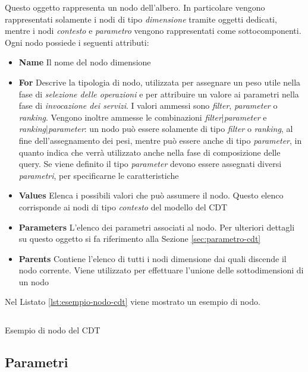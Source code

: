 Questo oggetto rappresenta un nodo dell'albero. In particolare vengono rappresentati solamente i nodi di tipo \emph{dimensione} tramite oggetti dedicati, mentre i nodi \emph{contesto} e \emph{parametro} vengono rappresentati come sottocomponenti. Ogni nodo possiede i seguenti attributi:

\begin{itemize}
	\item \textbf{Name}
	Il nome del nodo dimensione
	\item \textbf{For}
	Descrive la tipologia di nodo, utilizzata per assegnare un peso utile nella fase di \emph{selezione delle operazioni} e per attribuire un valore ai parametri nella fase di \emph{invocazione dei servizi}. I valori ammessi sono \emph{filter}, \emph{parameter} o \emph{ranking}. Vengono inoltre ammesse le combinazioni \emph{filter}|\emph{parameter} e \emph{ranking}|\emph{parameter}: un nodo può essere solamente di tipo \emph{filter} o \emph{ranking}, al fine dell'assegnamento dei pesi, mentre può essere anche di tipo \emph{parameter}, in quanto indica che verrà utilizzato anche nella fase di composizione delle query. Se viene definito il tipo \emph{parameter} devono essere assegnati diversi \emph{parametri}, per specificarne le caratteristiche
	\item \textbf{Values}
	Elenca i possibili valori che può assumere il nodo. Questo elenco corrisponde ai nodi di tipo \emph{contesto} del modello del CDT
	\item \textbf{Parameters}
	L'elenco dei parametri associati al nodo. Per ulteriori dettagli su questo oggetto si fa riferimento alla Sezione \ref{sec:parametro-cdt}
	\item \textbf{Parents}
	Contiene l'elenco di tutti i nodi dimensione dai quali discende il nodo corrente. Viene utilizzato per effettuare l'unione delle sottodimensioni di un nodo
\end{itemize}

Nel Listato \ref{lst:esempio-nodo-cdt} viene mostrato un esempio di nodo.
	
\begin{listing}[H]
	\inputminted{json}{5-implementazione-backend/Codice/esempio_nodo_cdt.json}
	\caption{Esempio di nodo del CDT}
	\label{lst:esempio-nodo-cdt}
\end{listing}

\subsection{Parametri\label{sec:parametro-cdt}}


